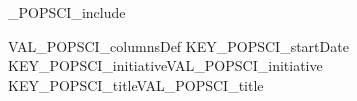 
%
\ifVAL_POPSCI_include %
\begin{myTableEnv}{VAL_POPSCI_columnsDef}
    \myRow
        {KEY_POPSCI_startDate}{}
        {KEY_POPSCI_initiative}{VAL_POPSCI_initiative}
    \myRow
        {KEY_POPSCI_title}{VAL_POPSCI_title}
        {}{}
\end{myTableEnv}
%
\fi
%